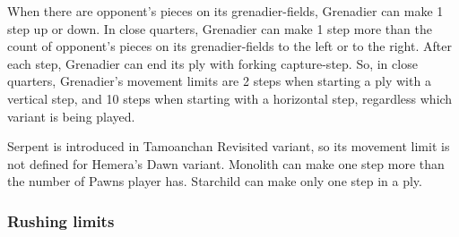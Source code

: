 When there are opponent's pieces on its grenadier-fields, Grenadier can make 1
step up or down. In close quarters, Grenadier can make 1 step more than the count
of opponent's pieces on its grenadier-fields to the left or to the right. After
each step, Grenadier can end its ply with forking capture-step.\newline
\indent
So, in close quarters, Grenadier's movement limits are 2 steps when starting
a ply with a vertical step, and 10 steps when starting with a horizontal step,
regardless which variant is being played.

Serpent is introduced in Tamoanchan Revisited variant, so its movement limit is
not defined for Hemera's Dawn variant.\newline
\indent
Monolith can make one step more than the number of Pawns player has.
Starchild can make only one step in a ply.

\clearpage %

\subsubsection*{Rushing limits}
\label{sec:Appendix/Summary/Movement limits/Rushing limits}

